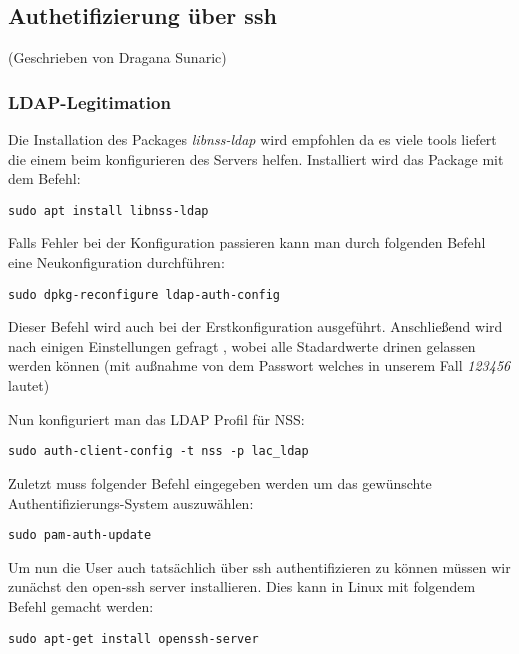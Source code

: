 \subsection{Authetifizierung über ssh}
(Geschrieben von Dragana Sunaric)

\subsubsection{LDAP-Legitimation}
Die Installation des Packages \textit{libnss-ldap} wird empfohlen da es viele tools liefert die einem beim konfigurieren des Servers helfen. Installiert wird das Package mit dem Befehl:

\verb|sudo apt install libnss-ldap|

Falls Fehler bei der Konfiguration passieren kann man durch folgenden Befehl eine Neukonfiguration durchführen:

\verb|sudo dpkg-reconfigure ldap-auth-config|

Dieser Befehl wird auch bei der Erstkonfiguration ausgeführt. Anschließend wird nach einigen Einstellungen gefragt , wobei alle Stadardwerte drinen gelassen werden können (mit außnahme von dem Passwort welches in unserem Fall \textit{123456} lautet) 

Nun konfiguriert man das LDAP Profil für NSS:

\verb|sudo auth-client-config -t nss -p lac_ldap|

Zuletzt muss folgender Befehl eingegeben werden um das gewünschte Authentifizierungs-System auszuwählen:

\verb|sudo pam-auth-update|

Um nun die User auch tatsächlich über ssh authentifizieren zu können müssen wir zunächst den open-ssh server installieren. Dies kann in Linux mit folgendem Befehl gemacht werden:

\verb|sudo apt-get install openssh-server|


